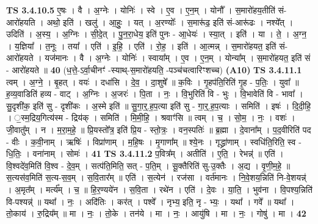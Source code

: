 \documentclass[17pt]{extarticle}
\begin{document}
                  \newline
                                \textbf{ TS 3.4.10.5} \newline
                  ए॒षः । वै । अ॒ग्नेः । योनिः॑ । स्वे । ए॒व । ए॒न॒म् । योनौ᳚ । स॒मारो॑हय॒तीति॑ सं-आरो॑हयति । अथो॒ इति॑ । खलु॑ । आ॒हुः॒ । यत् । अ॒रण्योः᳚ । स॒मारू॑ढ॒ इति॑ सं-आरू॑ढः । नश्ये᳚त् । उदिति॑ । अ॒स्य॒ । अ॒ग्निः । सी॒दे॒त् । पु॒न॒रा॒धेय॒ इति॑ पुनः - आ॒धेयः॑ । स्या॒त् । इति॑ । या । ते॒ । अ॒ग्न॒ । य॒ज्ञिया᳚ । त॒नूः । तया᳚ । एति॑ । इ॒हि॒ । एति॑ । रो॒ह॒ । इति॑ । आ॒त्मन्न् । स॒मारो॑हयत॒ इति॑ सं-आरो॑हयते । यज॑मानः । वै । अ॒ग्नेः । योनिः॑ । स्वाया᳚म् । ए॒व । ए॒न॒म् । योन्या᳚म् । स॒मारो॑हयत॒ इति॑ सं - आरो॑हयते ॥ \textbf{  40} \newline
                  \newline
                      (ध॒त्ते॒-ऽर्वा॒चीनꣳ॑ -स्याथ्-स॒मारो॑हयति॒ -पञ्च॑चत्वारिꣳशच्च)  \textbf{(A10)} \newline \newline
                                \textbf{ TS 3.4.11.1} \newline
                  त्वम् । अ॒ग्ने॒ । बृ॒हत् । वयः॑ । दधा॑सि । दे॒व॒ । दा॒शुषे᳚ ॥ क॒विः । गृ॒हप॑ति॒रिति॑ गृ॒ह - प॒तिः॒ । युवा᳚ ॥ ह॒व्य॒वाडिति॑ हव्य - वाट् । अ॒ग्निः । अ॒जरः॑ । पि॒ता । नः॒ । वि॒भुरिति॑ वि - भुः । वि॒भावेति॑ वि - भावा᳚ । सु॒दृशी॑क॒ इति॑ सु - दृशी॑कः । अ॒स्मे इति॑ ॥ सु॒गा॒र्॒.ह॒प॒त्या इति॑ सु - गा॒र्॒.ह॒प॒त्याः । समिति॑ । इषः॑ । दि॒दी॒हि॒ । ॒स्म॒द्रिय॒गित्य॑स्म - द्रिय॑क् । समिति॑ । मि॒मी॒हि॒ । श्रवाꣳ॑सि ॥ त्वम् । च॒ । सो॒म॒ । नः॒ । वशः॑ । जी॒वातु᳚म् । न । म॒रा॒म॒हे॒ ॥ प्रि॒यस्तो᳚त्र॒ इति॑ प्रि॒य - स्तो॒त्रः॒ । वन॒स्पतिः॑ ॥ ब्र॒ह्मा । दे॒वाना᳚म् । प॒द॒वीरिति॑ पद - वीः । क॒वी॒नाम् । ऋषिः॑ । विप्रा॑णाम् । म॒हि॒षः । मृ॒गाणा᳚म् ॥ श्ये॒नः । गृद्ध्रा॑णाम् । स्वधि॑ति॒रिति॒ स्व - धि॒तिः॒ । वना॑नाम् । सोमः॑ । \textbf{  41} \newline
                  \newline
                                \textbf{ TS 3.4.11.2} \newline
                  प॒वित्र᳚म् । अतीति॑ । ए॒ति॒ । रेभन्न्॑ ॥ एति॑ । वि॒श्वदे॑व॒मिति॑ वि॒श्व - दे॒व॒म् । सत्प॑ति॒मिति॒ सत् - प॒ति॒म् । सू॒क्तैरिति॑ सु-उ॒क्तैः । अ॒द्य । वृ॒णी॒म॒हे॒ ॥ स॒त्यस॑व॒मिति॑ स॒त्य-स॒व॒म् । स॒वि॒तार᳚म् ॥ एति॑ । स॒त्येन॑ । रज॑सा । वर्त॑मानः । नि॒वे॒शय॒न्निति॑ नि-वे॒शयन्न्॑ । अ॒मृत᳚म् । मर्त्य᳚म् । च॒ ॥ हि॒र॒ण्यये॑न । स॒वि॒ता । रथे॑न । एति॑ । दे॒वः । या॒ति॒ । भुव॑ना । वि॒पश्य॒न्निति॑ वि-पश्यन्न्॑ ॥ यथा᳚ । नः॒ । अदि॑तिः । कर॑त् । पश्वे᳚ । नृभ्य॒ इति॒ नृ - भ्यः॒ । यथा᳚ । गवे᳚ ॥ यथा᳚ । तो॒काय॑ । रु॒द्रिय᳚म् ॥ मा । नः॒ । तो॒के । तन॑ये । मा । नः॒ । आयु॑षि । मा । नः॒ । गोषु॑ । मा । \textbf{  42} \newline
\end{document}
